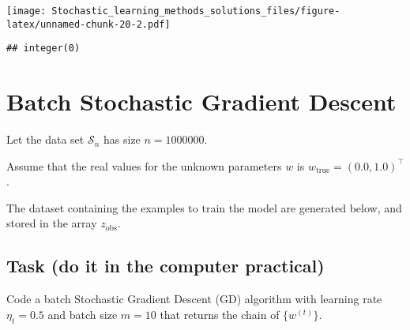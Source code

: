 \documentclass[
]{article}
\newenvironment{Shaded}{\begin{snugshade}}{\end{snugshade}}
\newcommand{\DataTypeTok}[1]{\textcolor[rgb]{0.13,0.29,0.53}{#1}}
\newcommand{\DecValTok}[1]{\textcolor[rgb]{0.00,0.00,0.81}{#1}}
\newcommand{\KeywordTok}[1]{\textcolor[rgb]{0.13,0.29,0.53}{\textbf{#1}}}
\newcommand{\NormalTok}[1]{#1}
\newcommand{\OperatorTok}[1]{\textcolor[rgb]{0.81,0.36,0.00}{\textbf{#1}}}
\newcommand{\StringTok}[1]{\textcolor[rgb]{0.31,0.60,0.02}{#1}}
\begin{document}
\texttt{[image: Stochastic\_learning\_methods\_solutions\_files/figure-latex/unnamed-chunk-20-2.pdf]}

\begin{verbatim}
## integer(0)
\end{verbatim}

\hypertarget{batch-stochastic-gradient-descent}{%
\section{Batch Stochastic Gradient
Descent}\label{batch-stochastic-gradient-descent}}

Let the data set \(\mathcal{S}_{n}\) has size \(n=1000000\).

Assume that the real values for the unknown parameters \(w\) is
\(w_{\text{true}}=(0.0,1.0)^\top\).

The dataset containing the examples to train the model are generated
below, and stored in the array \(z_{\text{obs}}\).

\begin{Shaded}
\end{Shaded}

\hypertarget{task-do-it-in-the-computer-practical-5}{%
\subsection{Task (do it in the computer
practical)}\label{task-do-it-in-the-computer-practical-5}}

Code a batch Stochastic Gradient Descent (GD) algorithm with learning
rate \(\eta_{t}=0.5\) and batch size \(m=10\) that returns the chain of
\(\{w^{(t)}\}\).
\end{document}

